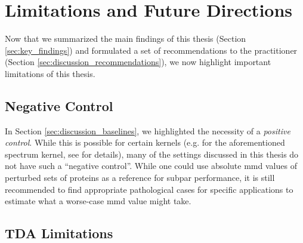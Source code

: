 \section{Limitations and Future Directions}\label{sec:discussion_limitations}

Now that we summarized the main findings of this thesis (Section
\ref{sec:key_findings}) and formulated a set of recommendations to the
practitioner (Section \ref{sec:discussion_recommendations}), we now highlight
important limitations of this thesis.


\subsection{Negative Control}

In Section \ref{sec:discussion_baselines}, we highlighted the necessity of a
\emph{positive control}. While this is possible for certain kernels (e.g. for
the aforementioned spectrum kernel, see \cite{kucera2022conditional} for
details), many of the settings discussed in this thesis do not have such a
``negative control''. While one could use absolute \acrshort{mmd} values of perturbed sets
of proteins as a reference for subpar performance, it is still recommended to find
appropriate pathological cases for specific applications to estimate what a worse-case
\acrshort{mmd} value might take.



\subsection{TDA Limitations}\label{sec:tda_limitations}

